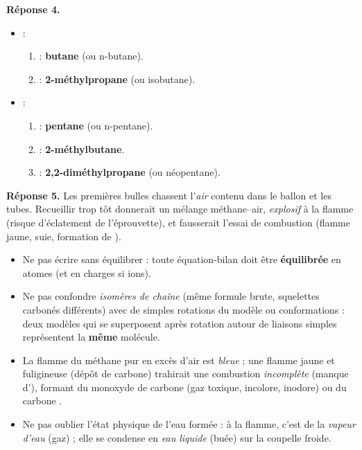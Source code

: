 \documentclass[11pt]{article}
\begin{document}
\begin{exoresolu}
\textbf{Réponse 4.}
\begin{itemize}
\item {} :
      \begin{enumerate}
      \item {} : \textbf{butane} (ou n-butane).
      \item {} : \textbf{2-méthylpropane} (ou isobutane).
      \end{enumerate}
\item {} :
      \begin{enumerate}
      \item {} : \textbf{pentane} (ou n-pentane).
      \item {} : \textbf{2-méthylbutane}.
      \item {} : \textbf{2,2-diméthylpropane} (ou néopentane).
      \end{enumerate}
\end{itemize}

\textbf{Réponse 5.} Les premières bulles chassent l'\emph{air} contenu dans le ballon et les tubes. Recueillir trop tôt donnerait un mélange méthane--air, \emph{explosif} à la flamme (risque d'éclatement de l'éprouvette), et fausserait l'essai de combustion (flamme jaune, suie, formation de ).
\end{exoresolu}

\begin{attention}
\begin{itemize}
\item Ne pas écrire  sans équilibrer : toute équation-bilan doit être \textbf{équilibrée} en atomes (et en charges si ions).
\item Ne pas confondre \emph{isomères de chaîne} (même formule brute, squelettes carbonés différents) avec de simples rotations du modèle ou conformations : deux modèles qui se superposent après rotation autour de liaisons simples représentent la \textbf{même} molécule.
\item La flamme du méthane pur en excès d'air est \emph{bleue} ; une flamme jaune et fuligineuse (dépôt de carbone) trahirait une combustion \emph{incomplète} (manque d'), formant du monoxyde de carbone  (gaz toxique, incolore, inodore) ou du carbone .
\item Ne pas oublier l'état physique de l'eau formée : à la flamme, c'est de la \emph{vapeur d'eau} (gaz) ; elle se condense en \emph{eau liquide} (buée) sur la coupelle froide.
\end{itemize}
\end{attention}
\end{document}
